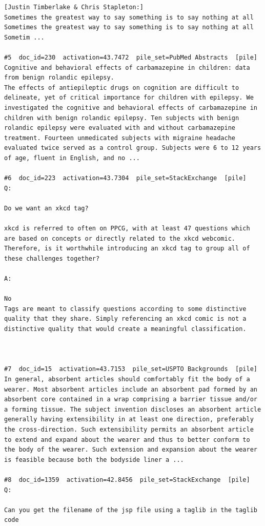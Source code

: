 \begin{verbatim}
[Justin Timberlake & Chris Stapleton:]
Sometimes the greatest way to say something is to say nothing at all
Sometimes the greatest way to say something is to say nothing at all
Sometim ...

#5  doc_id=230  activation=43.7472  pile_set=PubMed Abstracts  [pile]
Cognitive and behavioral effects of carbamazepine in children: data from benign rolandic epilepsy.
The effects of antiepileptic drugs on cognition are difficult to delineate, yet of critical importance for children with epilepsy. We investigated the cognitive and behavioral effects of carbamazepine in children with benign rolandic epilepsy. Ten subjects with benign rolandic epilepsy were evaluated with and without carbamazepine treatment. Fourteen unmedicated subjects with migraine headache evaluated twice served as a control group. Subjects were 6 to 12 years of age, fluent in English, and no ...

#6  doc_id=223  activation=43.7304  pile_set=StackExchange  [pile]
Q:

Do we want an xkcd tag?

xkcd is referred to often on PPCG, with at least 47 questions which are based on concepts or directly related to the xkcd webcomic.
Therefore, is it worthwhile introducing an xkcd tag to group all of these challenges together?

A:

No
Tags are meant to classify questions according to some distinctive quality that they share. Simply referencing an xkcd comic is not a distinctive quality that would create a meaningful classification.



#7  doc_id=15  activation=43.7153  pile_set=USPTO Backgrounds  [pile]
In general, absorbent articles should comfortably fit the body of a wearer. Most absorbent articles include an absorbent pad formed by an absorbent core contained in a wrap comprising a barrier tissue and/or a forming tissue. The subject invention discloses an absorbent article generally having extensibility in at least one direction, preferably the cross-direction. Such extensibility permits an absorbent article to extend and expand about the wearer and thus to better conform to the body of the wearer. Such extension and expansion about the wearer is feasible because both the bodyside liner a ...

#8  doc_id=1359  activation=42.8456  pile_set=StackExchange  [pile]
Q:

Can you get the filename of the jsp file using a taglib in the taglib code


\end{verbatim}
